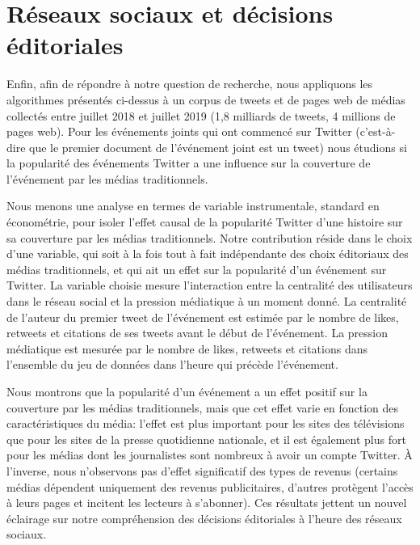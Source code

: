 \section*{Réseaux sociaux et décisions éditoriales}
Enfin, afin de répondre à notre question de recherche, nous appliquons les algorithmes présentés ci-dessus à un corpus de tweets et de pages web de médias collectés entre juillet 2018 et juillet 2019 (1,8 milliards de tweets, 4 millions de pages web). Pour les événements joints qui ont commencé sur Twitter (c'est-à-dire que le premier document de l'événement joint est un tweet) nous étudions si la popularité des événements Twitter a une influence sur la couverture de l'événement par les médias traditionnels.

Nous menons une analyse en termes de variable instrumentale, standard en économétrie, pour isoler l'effet causal de la popularité Twitter d'une histoire sur sa couverture par les médias traditionnels. Notre contribution réside dans le choix d'une variable, qui soit à la fois tout à fait indépendante des choix éditoriaux des médias traditionnels, et qui ait un effet sur la popularité d'un événement sur Twitter. La variable choisie mesure l'interaction entre la centralité des utilisateurs dans le réseau social et la pression médiatique à un moment donné. La centralité de l'auteur du premier tweet de l'événement est estimée par le nombre de likes, retweets et citations de ses tweets avant le début de l'événement. La pression médiatique est mesurée par le nombre de likes, retweets et citations dans l'ensemble du jeu de données dans l'heure qui précède l'événement.

Nous montrons que la popularité d'un événement a un effet positif sur la couverture par les médias traditionnels, mais que cet effet varie en fonction des caractéristiques du média: l'effet est plus important pour les sites des télévisions que pour les sites de la presse quotidienne nationale, et il est également plus fort pour les médias dont les journalistes sont nombreux à avoir un compte Twitter. À l'inverse, nous n'observons pas d'effet significatif des types de revenus (certains médias dépendent uniquement des revenus publicitaires, d'autres protègent l'accès à leurs pages et incitent les lecteurs à s'abonner). Ces résultats jettent un nouvel éclairage sur notre compréhension des décisions éditoriales à l'heure des réseaux sociaux.